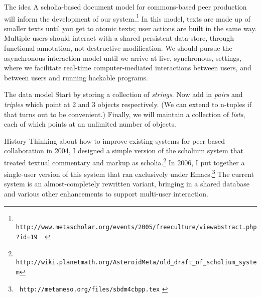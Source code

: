 \begin{notate}{The idea} \label{theoretical-context}
A scholia-based document model for commons-based peer
production will inform the development of our
system.\footnote{{\tt
http://www.metascholar.org/events/2005/freeculture/viewabstract.php?id=19
\label{corneli-krowne}
}}
In this model, texts are made up of smaller texts until
you get to atomic texts; user actions are built in the
same way.  Multiple users should interact with a shared
persistent data-store, through functional annotation, not
destructive modification.  We should pursue the
asynchronous interaction model until we arrive at live,
synchronous, settings, where we facilitate real-time
computer-mediated interactions between users, and between
users and running hackable programs.
\end{notate}

\begin{notate}{The data model} \label{data-model}
Start by storing a collection of \emph{strings}.  Now add
in \emph{pairs} and \emph{triples} which point at 2 and 3
objects respectively.  (We can extend to n-tuples if that
turns out to be convenient.)  Finally, we will maintain a
collection of \emph{lists}, each of which points at an
unlimited number of objects.
\end{notate}

\begin{notate}{History}
Thinking about how to improve existing systems for
peer-based collaboration in 2004, I designed a simple
version of the scholium system that treated textual
commentary and markup as scholia.\footnote{{\tt
    http://wiki.planetmath.org/AsteroidMeta/old\_draft\_of\_scholium\_system}}
In 2006, I put together a single-user version of this
system that ran exclusively under Emacs.\footnote{{\tt
    http://metameso.org/files/sbdm4cbpp.tex} \label{old-version}}
The current system is an almost-completely rewritten
variant, bringing in a shared database and various other
enhancements to support multi-user interaction.
\end{notate}

